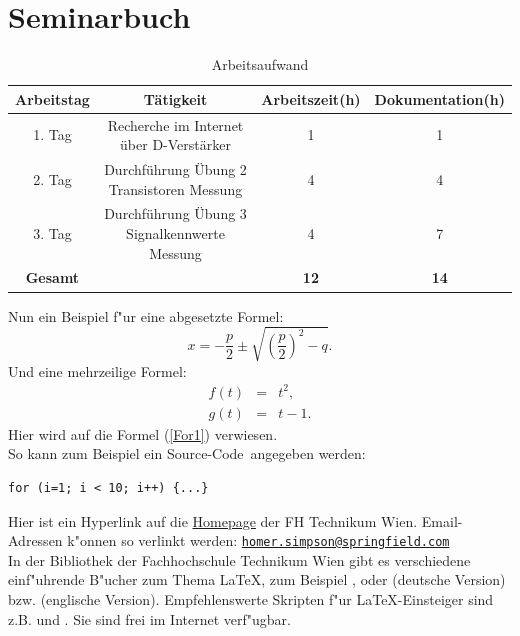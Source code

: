 \documentclass[a4paper,bibtotoc,oneside]{scrbook}
\begin{document}
\chapter{Seminarbuch}
\begin{table}[htbp]
  \centering
  \captionsetup{margin=1pt,font=small,labelfont=bf}
  \caption{Arbeitsaufwand}
    \begin{tabular}{| c | c| c | c |}\hline
    {\bf Arbeitstag} &{\bf Tätigkeit} &{\bf Arbeitszeit(h)} &{\bf Dokumentation(h)} \\\hline
    \hline
    1. Tag   & Recherche im Internet über D-Verstärker   & 1   & 1 \\
    2. Tag   & Durchführung Übung 2 Transistoren Messung  & 4   & 4 \\
    3. Tag   & Durchführung Übung 3 Signalkennwerte Messung   & 4   & 7 \\
    \hline
    \textbf{Gesamt}   & \textbf{}    & \textbf{12}   & \textbf{14} \\
    \hline
    \end{tabular}%
  \label{tab:addlabel}%
\end{table}%
\noindent
Nun ein Beispiel f"ur eine abgesetzte Formel:
\begin{equation}
x =  - \frac{p}{2} \pm \sqrt{\left(\frac{p}{2}\right)^2 - q}.
\end{equation}
Und eine mehrzeilige Formel:
\begin{eqnarray}
f(t)&=& t^2 \label{For1},\\
g(t) &=& t-1.
\end{eqnarray}
Hier wird auf die Formel (\ref{For1}) verwiesen. \\

\noindent
So kann zum Beispiel ein \glqq Source-Code\grqq\  angegeben werden:
\begin{verbatim}
for (i=1; i < 10; i++) {...}
\end{verbatim}

\noindent
Hier ist ein Hyperlink auf die  \href{http://www.technikum-wien.at}{Homepage} der FH Technikum Wien. Email-Adressen k"onnen so verlinkt werden: \href{mailto:homer.simpson@springfield.com}{\texttt{homer.simpson@springfield.com}}\\

\noindent
In der Bibliothek der Fachhochschule Technikum Wien gibt es verschiedene einf"uhrende B"ucher zum Thema \glqq \LaTeX \grqq, zum Beispiel \cite{kop05}, \cite{wil06} oder \cite{mgb+05d} (deutsche Version) bzw. \cite{mgb+04e} (englische Version). Empfehlenswerte Skripten f"ur \LaTeX-Einsteiger sind z.B. \cite{mj00} und \cite{mj95}. Sie sind frei im Internet verf"ugbar.
\end{document}
